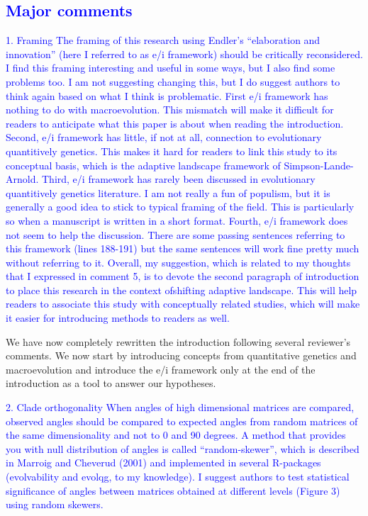 \documentclass[12pt,letterpaper]{article}
\begin{document}
{\subsection*{\textcolor{blue}{Major comments}}

\textcolor{blue}{1. Framing
The framing of this research using Endler’s “elaboration and innovation” (here I referred to as e/i framework) should be critically reconsidered. I find this framing interesting and useful in some ways, but I also find some problems too. I am not suggesting changing this, but I do suggest authors to think again based on what I think is problematic.
First e/i framework has nothing to do with macroevolution. This mismatch will make it difficult for readers to anticipate what this paper is about when reading the introduction. Second, e/i framework has little, if not at all, connection to evolutionary quantitively genetics. This makes it hard for readers to link this study to its conceptual basis, which is the adaptive landscape framework of Simpson-Lande-Arnold. Third, e/i framework has rarely been discussed in evolutionary quantitively genetics literature. I am not really a fun of populism, but it is generally a good idea to stick to typical framing of the field. This is particularly so when a manuscript is written in a short format. Fourth, e/i framework does not seem to help the discussion. There are some passing sentences referring to this framework (lines 188-191) but the same sentences will work fine pretty much without referring to it. Overall, my suggestion, which is related to my thoughts that I expressed in comment 5, is to devote the second paragraph of introduction to place this research in the context ofshifting adaptive landscape. This will help readers to associate this study with conceptually related studies, which will make it easier for introducing methods to readers as well.
}

We have now completely rewritten the introduction following several reviewer’s comments. We now start by introducing concepts from quantitative genetics and macroevolution and introduce the e/i framework only at the end of the introduction as a tool to answer our hypotheses.

\textcolor{blue}{2. Clade orthogonality
When angles of high dimensional matrices are compared, observed angles should be compared to expected angles from random matrices of the same dimensionality and not to 0 and 90 degrees. A method that provides you with null distribution of angles is called “random-skewer”, which is described in Marroig and Cheverud (2001) and implemented in several R-packages (evolvability and evolqg, to my knowledge). I suggest authors to test statistical significance of angles between matrices obtained at different levels (Figure 3) using random skewers.}


}
\end{document}

